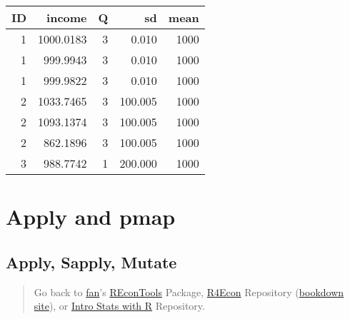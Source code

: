 \documentclass[
]{book}
\newenvironment{Shaded}{\begin{snugshade}}{\end{snugshade}}
\newcommand{\KeywordTok}[1]{\textcolor[rgb]{0.13,0.29,0.53}{\textbf{#1}}}
\newcommand{\NormalTok}[1]{#1}
\newcommand{\OperatorTok}[1]{\textcolor[rgb]{0.81,0.36,0.00}{\textbf{#1}}}
\newcommand{\StringTok}[1]{\textcolor[rgb]{0.31,0.60,0.02}{#1}}
\begin{document}
\begin{Shaded}
\end{Shaded}

\begin{table}[!h]
\centering
\begin{tabular}{r|r|r|r|r}
\hline
ID & income & Q & sd & mean\\
\hline
\rowcolor{gray!6}  1 & 1000.0183 & 3 & 0.010 & 1000\\
\hline
1 & 999.9943 & 3 & 0.010 & 1000\\
\hline
\rowcolor{gray!6}  1 & 999.9822 & 3 & 0.010 & 1000\\
\hline
2 & 1033.7465 & 3 & 100.005 & 1000\\
\hline
\rowcolor{gray!6}  2 & 1093.1374 & 3 & 100.005 & 1000\\
\hline
2 & 862.1896 & 3 & 100.005 & 1000\\
\hline
\rowcolor{gray!6}  3 & 988.7742 & 1 & 200.000 & 1000\\
\hline
\end{tabular}
\end{table}

\hypertarget{apply-and-pmap}{%
\section{Apply and pmap}\label{apply-and-pmap}}

\hypertarget{apply-sapply-mutate}{%
\subsection{Apply, Sapply, Mutate}\label{apply-sapply-mutate}}

\begin{quote}
Go back to \href{http://fanwangecon.github.io/}{fan}'s \href{https://fanwangecon.github.io/REconTools/}{REconTools} Package, \href{https://fanwangecon.github.io/R4Econ/}{R4Econ} Repository (\href{https://fanwangecon.github.io/R4Econ/bookdown}{bookdown site}), or \href{https://fanwangecon.github.io/Stat4Econ/}{Intro Stats with R} Repository.
\end{quote}
\end{document}
